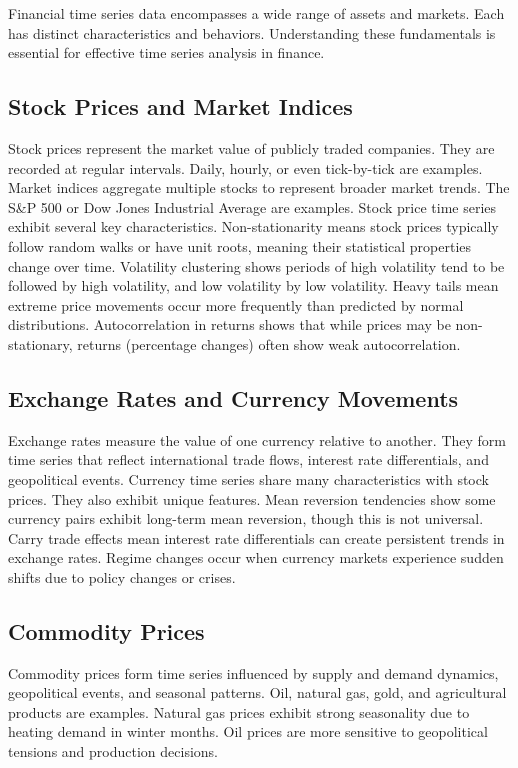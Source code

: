 Financial time series data encompasses a wide range of assets and markets. Each has distinct characteristics and behaviors. Understanding these fundamentals is essential for effective time series analysis in finance.

\subsection{Stock Prices and Market Indices}

Stock prices represent the market value of publicly traded companies. They are recorded at regular intervals. Daily, hourly, or even tick-by-tick are examples. Market indices aggregate multiple stocks to represent broader market trends. The S\&P 500 or Dow Jones Industrial Average are examples. Stock price time series exhibit several key characteristics. Non-stationarity means stock prices typically follow random walks or have unit roots, meaning their statistical properties change over time. Volatility clustering shows periods of high volatility tend to be followed by high volatility, and low volatility by low volatility. Heavy tails mean extreme price movements occur more frequently than predicted by normal distributions. Autocorrelation in returns shows that while prices may be non-stationary, returns (percentage changes) often show weak autocorrelation.

\subsection{Exchange Rates and Currency Movements}

Exchange rates measure the value of one currency relative to another. They form time series that reflect international trade flows, interest rate differentials, and geopolitical events. Currency time series share many characteristics with stock prices. They also exhibit unique features. Mean reversion tendencies show some currency pairs exhibit long-term mean reversion, though this is not universal. Carry trade effects mean interest rate differentials can create persistent trends in exchange rates. Regime changes occur when currency markets experience sudden shifts due to policy changes or crises.

\subsection{Commodity Prices}

Commodity prices form time series influenced by supply and demand dynamics, geopolitical events, and seasonal patterns. Oil, natural gas, gold, and agricultural products are examples. Natural gas prices exhibit strong seasonality due to heating demand in winter months. Oil prices are more sensitive to geopolitical tensions and production decisions.

